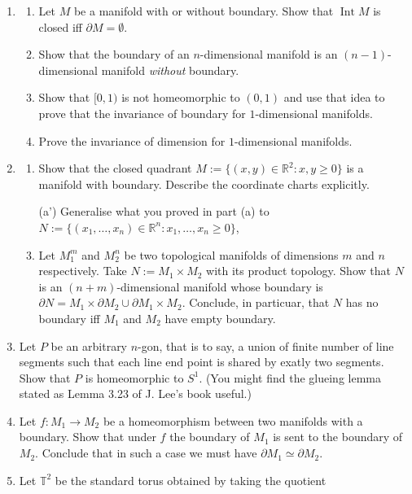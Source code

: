 \documentclass[notoc,notitlepage]{tufte-book}
\DeclareMathOperator{\Int}{Int}
\begin{document}
\begin{enumerate}
  \item 
    \begin{enumerate}
      \item Let $M$ be a manifold with or without boundary. Show that $\Int M$ is closed
        iff $\partial M = \emptyset$.
      \item Show that the boundary of an $n$-dimensional manifold is an $(n - 1)$-dimensional
        manifold \textit{without} boundary.
      \item Show that $[0, 1)$ is not homeomorphic to $(0, 1)$ and use that idea to prove
        that the invariance of boundary for $1$-dimensional manifolds.
      \item Prove the invariance of dimension for $1$-dimensional manifolds.
    \end{enumerate}
  \item
    \begin{enumerate}
      \item Show that the closed quadrant $M := \{ (x, y) \in \mathbb{R}^2 : x, y \geq 0 \}$
        is a manifold with boundary. Describe the coordinate charts explicitly.
      \item[(a')] Generalise what you proved in part (a) to
        $N := \{ (x_1, \ldots, x_n) \in \mathbb{R}^n : x_1, \ldots, x_n \geq 0 \}$,
      \item Let $M_1^m$ and $M_2^n$ be two topological manifolds of dimensions $m$ and $n$
        respectively. Take $N := M_1 \times M_2$ with its product topology. Show that $N$
        is an $(n + m)$-dimensional manifold whose boundary is
        $\partial N = M_1 \times \partial M_2 \cup \partial M_1 \times M_2$. Conclude, in
        particuar, that $N$ has no boundary iff $M_1 $ and $M_2$ have empty boundary.
    \end{enumerate}
  \item Let $P$ be an arbitrary $n$-gon, that is to say, a union of finite number of line
    segments such that each line end point is shared by exatly two segments. Show that $P$
    is homeomorphic to $S^1$. (You might find the glueing lemma stated as Lemma 3.23 of J.
    Lee's book useful.)
  \item Let $f : M_1 \to M_2$ be a homeomorphism between two manifolds with a boundary.
    Show that under $f$ the boundary of $M_1$ is sent to the boundary of $M_2$. Conclude
    that in such a case we must have $\partial M_1 \simeq \partial M_2$.
  \item Let $\mathbb{T}^2$ be the standard torus obtained by taking the quotient

\end{enumerate}
\end{document}
